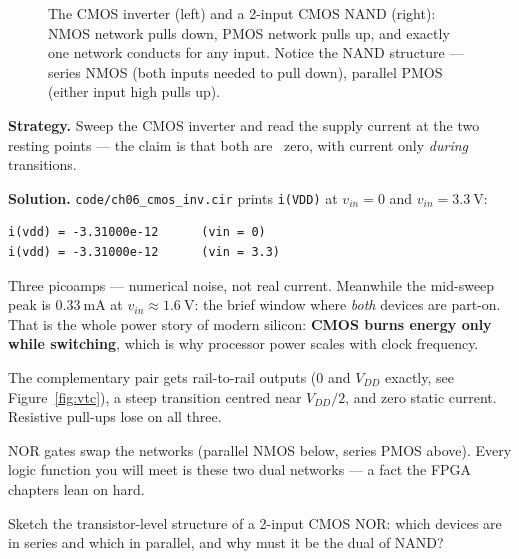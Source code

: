 \begin{figure}[htbp]
\centering

\caption{The CMOS inverter (left) and a 2-input CMOS NAND (right): NMOS
network pulls down, PMOS network pulls up, and exactly one network conducts
for any input. Notice the NAND structure — series NMOS (both inputs needed
to pull down), parallel PMOS (either input high pulls up).}
\label{fig:cmos}
\end{figure}

\begin{example}\label{ex:cmospower}
\textbf{Strategy.} Sweep the CMOS inverter and read the supply current at
the two resting points — the claim is that both are ~zero, with current only
\emph{during} transitions.

\textbf{Solution.} \texttt{code/ch06\_cmos\_inv.cir} prints
\texttt{i(VDD)} at $v_{in}=0$ and $v_{in}=\qty{3.3}{\volt}$:
\end{example}

\begin{lstlisting}[language={},caption={Static points of the CMOS sweep --- compare with the NMOS inverter's \qty{0.32}{\milli\ampere}.}]
i(vdd) = -3.31000e-12      (vin = 0)
i(vdd) = -3.31000e-12      (vin = 3.3)
\end{lstlisting}

Three picoamps — numerical noise, not real current. Meanwhile the mid-sweep
peak is $\qty{0.33}{\milli\ampere}$ at $v_{in}\approx\qty{1.6}{\volt}$: the
brief window where \emph{both} devices are part-on. That is the whole power
story of modern silicon: \textbf{CMOS burns energy only while
switching}, which is why processor power scales with
clock frequency.

\begin{principle}
The complementary pair gets rail-to-rail outputs (0 and $V_{DD}$ exactly,
see Figure~\ref{fig:vtc}), a steep transition centred near $V_{DD}/2$, and
zero static current. Resistive pull-ups lose on all three.
\end{principle}

NOR gates swap the networks (parallel NMOS below, series PMOS above).
Every logic function you will meet is these two dual networks — a fact the
FPGA chapters lean on hard.

\begin{exercise}[medium]
Sketch the transistor-level structure of a 2-input CMOS NOR: which devices
are in series and which in parallel, and why must it be the dual of NAND?
\end{exercise}

